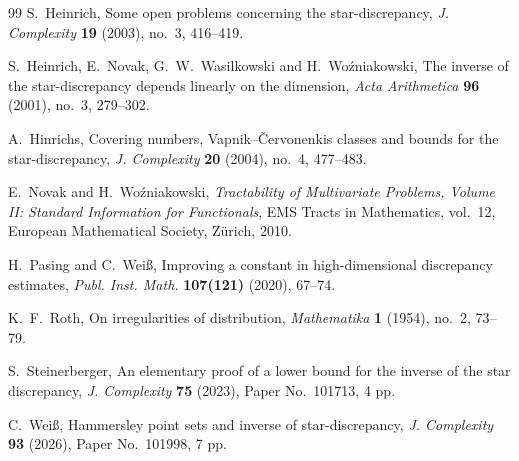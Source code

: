 \documentclass[11pt]{article}
\theoremstyle{plain}
\theoremstyle{remark}
\theoremstyle{definition}
\newcommand{\1}{\mathbf{1}}
\begin{document}
\begin{thebibliography}{99}
S.~Heinrich,
\newblock Some open problems concerning the star-discrepancy,
\newblock \emph{J. Complexity} \textbf{19} (2003), no.~3, 416--419.

S.~Heinrich, E.~Novak, G.~W.~Wasilkowski and H.~Wo\'{z}niakowski,
\newblock The inverse of the star-discrepancy depends linearly on the dimension,
\newblock \emph{Acta Arithmetica} \textbf{96} (2001), no.~3, 279--302.


A.~Hinrichs,
\newblock Covering numbers, Vapnik--\v{C}ervonenkis classes and bounds for the star-discrepancy,
\newblock \emph{J. Complexity} \textbf{20} (2004), no.~4, 477--483.

E.~Novak and H.~Wo\'{z}niakowski,
\newblock \emph{Tractability of Multivariate Problems,
Volume II: Standard Information for Functionals},
\newblock EMS Tracts in Mathematics, vol.~12,
European Mathematical Society, Z\"urich, 2010.

H.~Pasing and C.~Wei\ss,
\newblock Improving a constant in high-dimensional discrepancy estimates,
\newblock \emph{Publ. Inst. Math.} \textbf{107(121)} (2020), 67--74.


K.~F.~Roth,
\newblock On irregularities of distribution,
\newblock \emph{Mathematika} \textbf{1} (1954), no.~2, 73--79.

S.~Steinerberger,
\newblock An elementary proof of a lower bound for the inverse of the star discrepancy,
\newblock \emph{J. Complexity} \textbf{75} (2023), Paper No.~101713, 4 pp.

C.~Wei\ss, Hammersley point sets and inverse of star-discrepancy,
\newblock \emph{J. Complexity} \textbf{93} (2026), Paper No.~101998, 7 pp.

\end{thebibliography}
\end{document}
